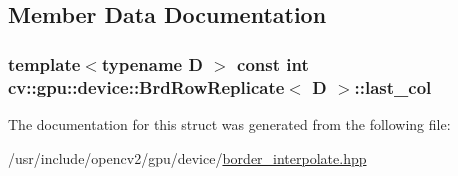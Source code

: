\subsection{Member Data Documentation}
\hypertarget{structcv_1_1gpu_1_1device_1_1BrdRowReplicate_a00d59184467b791a35bd04e8f7be8c81}{
\subsubsection[{last\-\_\-col}]{\setlength{\rightskip}{0pt plus 5cm}template$<$typename D $>$ const int {\bf cv\-::gpu\-::device\-::\-Brd\-Row\-Replicate}$<$ D $>$\-::last\-\_\-col}}\label{structcv_1_1gpu_1_1device_1_1BrdRowReplicate_a00d59184467b791a35bd04e8f7be8c81}


The documentation for this struct was generated from the following file\-:\begin{DoxyCompactItemize}
\item 
/usr/include/opencv2/gpu/device/\hyperlink{border__interpolate_8hpp}{border\-\_\-interpolate.\-hpp}\end{DoxyCompactItemize}
